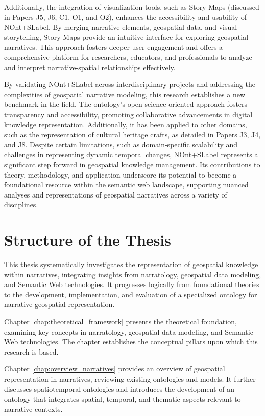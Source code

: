 Additionally, the integration of visualization tools, such as Story Maps (discussed in Papers J5, J6, C1, O1, and O2), enhances the accessibility and usability of \acrshort{NOnt+SLabel}. By merging narrative elements, geospatial data, and visual storytelling, Story Maps provide an intuitive interface for exploring geospatial narratives. This approach fosters deeper user engagement and offers a comprehensive platform for researchers, educators, and professionals to analyze and interpret narrative-spatial relationships effectively.

By validating \acrshort{NOnt+SLabel} across interdisciplinary projects and addressing the complexities of geospatial narrative modeling, this research establishes a new benchmark in the field. The ontology’s open science-oriented approach fosters transparency and accessibility, promoting collaborative advancements in digital knowledge representation. Additionally, it has been applied to other domains, such as the representation of cultural heritage crafts, as detailed in Papers J3, J4, and J8. Despite certain limitations, such as domain-specific scalability and challenges in representing dynamic temporal changes, \acrshort{NOnt+SLabel} represents a significant step forward in geospatial knowledge management. Its contributions to theory, methodology, and application underscore its potential to become a foundational resource within the semantic web landscape, supporting nuanced analyses and representations of geospatial narratives across a variety of disciplines.

\section{Structure of the Thesis}\label{I-sec:StructureOfTheThesis}

This thesis systematically investigates the representation of geospatial knowledge within narratives, integrating insights from narratology, geospatial data modeling, and Semantic Web technologies. It progresses logically from foundational theories to the development, implementation, and evaluation of a specialized ontology for narrative geospatial representation.

Chapter \ref{chap:theoretical_framework} presents the theoretical foundation, examining key concepts in narratology, geospatial data modeling, and Semantic Web technologies. The chapter establishes the conceptual pillars upon which this research is based.

Chapter \ref{chap:overview_narratives} provides an overview of geospatial representation in narratives, reviewing existing ontologies and models. It further discusses spatiotemporal ontologies and introduces the development of an ontology that integrates spatial, temporal, and thematic aspects relevant to narrative contexts.

